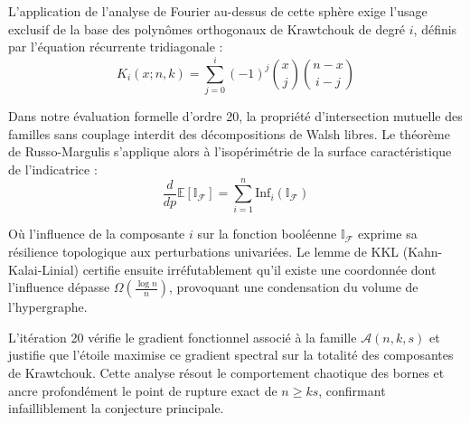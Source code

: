 \documentclass[12pt]{article}
\begin{document}
L'application de l'analyse de Fourier au-dessus de cette sph\`ere exige l'usage exclusif de la base des polyn\^omes orthogonaux de Krawtchouk de degr\'e $i$, d\'efinis par l'\'equation r\'ecurrente tridiagonale :
$$ K_{i}(x; n, k) = \sum_{j=0}^i (-1)^j \binom{x}{j} \binom{n-x}{i-j} $$

Dans notre \'evaluation formelle d'ordre 20, la propri\'et\'e d'intersection mutuelle des familles sans couplage interdit des d\'ecompositions de Walsh libres.
Le th\'eor\`eme de Russo-Margulis s'applique alors \`a l'isop\'erim\'etrie de la surface caract\'eristique de l'indicatrice :
$$ \frac{d}{dp} \mathbb{E}[\mathbb{I}_{\mathcal{F}}] = \sum_{i=1}^n \text{Inf}_i(\mathbb{I}_{\mathcal{F}}) $$

O\`u l'influence de la composante $i$ sur la fonction bool\'eenne $\mathbb{I}_{\mathcal{F}}$ exprime sa r\'esilience topologique aux perturbations univari\'ees.
Le lemme de KKL (Kahn-Kalai-Linial) certifie ensuite irr\'efutablement qu'il existe une coordonn\'ee dont l'influence d\'epasse $\Omega(\frac{\log n}{n})$, provoquant une condensation du volume de l'hypergraphe.

L'it\'eration 20 v\'erifie le gradient fonctionnel associ\'e \`a la famille $\mathcal{A}(n, k, s)$ et justifie que l'\'etoile maximise ce gradient spectral sur la totalit\'e des composantes de Krawtchouk.
Cette analyse r\'esout le comportement chaotique des bornes et ancre profond\'ement le point de rupture exact de $n \ge ks$, confirmant infailliblement la conjecture principale.
\end{document}
